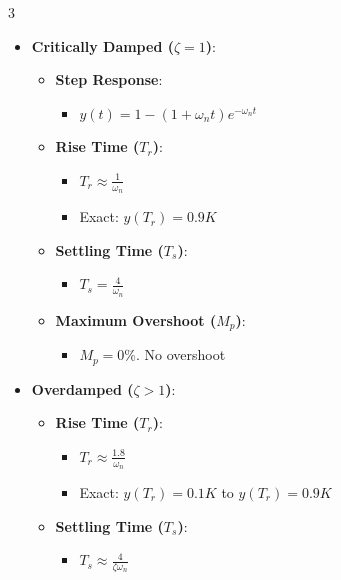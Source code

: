 \documentclass[letterpaper,10pt]{article}
\begin{document}
\begin{multicols}{3}
\begin{itemize}[leftmargin=*]
    \item \textbf{Critically Damped (\(\zeta =1\))}:
    \begin{itemize}[leftmargin=*]
        \item \textbf{Step Response}: 
        \begin{itemize}[leftmargin=*]
            \item \( y(t) = 1 - (1+\omega_n t)e^{-\omega_n t} \)
        \end{itemize}
        
        \item \textbf{Rise Time (\(T_r\))}:
        \begin{itemize}[leftmargin=*]
            \item \( T_r \approx \frac{1}{\omega_n} \)
            \item Exact: \( y(T_r) = 0.9K \)
        \end{itemize}
        
        \item \textbf{Settling Time (\(T_s\))}:
        \begin{itemize}[leftmargin=*]
            \item  \( T_s = \frac{4}{\omega_n} \)
        \end{itemize}
        
        \item \textbf{Maximum Overshoot (\(M_p\))}:
        \begin{itemize}[leftmargin=*]
            \item \( M_p = 0\% \). No overshoot
        \end{itemize}
    \end{itemize}
    
    \item \textbf{Overdamped (\(\zeta >1\))}:
    \begin{itemize}[leftmargin=*]
        \item \textbf{Rise Time (\(T_r\))}:
        \begin{itemize}[leftmargin=*]
            \item \( T_r \approx \frac{1.8}{\omega_n} \)
            \item Exact: \( y(T_r) = 0.1K \) to \( y(T_r) = 0.9K \)
        \end{itemize}
        
        \item \textbf{Settling Time (\(T_s\))}:
        \begin{itemize}[leftmargin=*]
            \item \( T_s \approx \frac{4}{\zeta\omega_n} \)
        \end{itemize}
        

\end{itemize}
\end{itemize}
\end{multicols}
\end{document}
